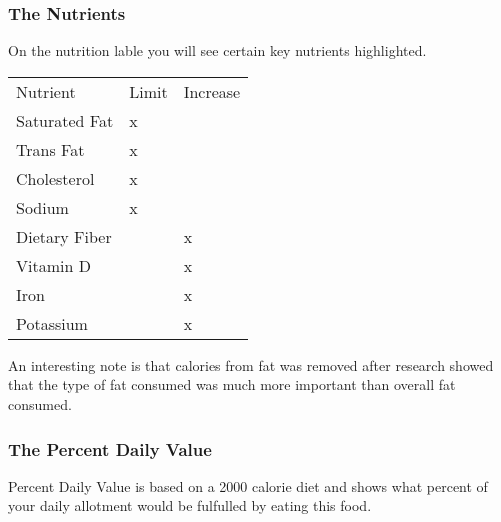 \documentclass[letterpaper, 11pt]{article}
\begin{document}
\subsubsection{The Nutrients}
\label{sec:org279d1d0}
On the nutrition lable you will see certain key nutrients highlighted.\\
\begin{center}
\begin{tabular}{lll}
Nutrient & Limit & Increase\\
Saturated Fat & x & \\
Trans Fat & x & \\
Cholesterol & x & \\
Sodium & x & \\
Dietary Fiber &  & x\\
Vitamin D &  & x\\
Iron &  & x\\
Potassium &  & x\\
\end{tabular}
\end{center}
An interesting note is that calories from fat was removed after research showed that the type of fat consumed was much more important than overall fat consumed.\\
\subsubsection{The Percent Daily Value}
\label{sec:org30fd63f}
Percent Daily Value is based on a 2000 calorie diet and shows what percent of your daily allotment would be fulfulled by eating this food.\\
\end{document}
